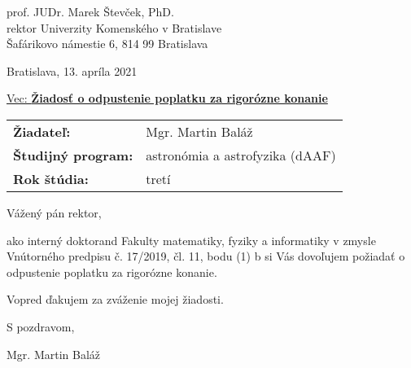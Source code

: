 \documentclass[12pt, a4paper, oneside]{report}
\begin{document}
    \linespread{1.3}
    \setcounter{secnumdepth}{0}
    \setlength{\parindent}{0cm}
    \setlength{\parskip}{3mm}
    \setlength{\baselineskip}{6mm}
    \setlength{\abovedisplayskip}{0mm}
    \setlength{\belowdisplayskip}{0mm}
    \setlength{\abovedisplayshortskip}{0mm}
    \setlength{\belowdisplayshortskip}{5mm}
    \renewcommand{\arraystretch}{1.2}

    \pagestyle{empty}
    \thispagestyle{first}

    \vspace*{26mm}
    \hfill
    \begin{minipage}{0.43 \linewidth}
        \linespread{1.6}
        prof. JUDr. Marek Števček, PhD. \\[1mm]
        rektor Univerzity Komenského v Bratislave \\[1mm]
        Šafárikovo námestie 6, 814 99 Bratislava

        \vspace*{12mm}
        Bratislava, 13. apríla 2021
    \end{minipage}

    \vspace{30mm}

    \underline{Vec: \textbf{Žiadosť o odpustenie poplatku za rigorózne konanie}}

    \vspace{4mm}

    \begin{tabular}{l l}
        \textbf{Žiadateľ:}          & Mgr. Martin Baláž \\
        \textbf{Študijný program:}  & astronómia a astrofyzika (dAAF) \\
        \textbf{Rok štúdia:}        & tretí \\
    \end{tabular}

    \vspace{20mm}

    Vážený pán rektor,

    ako interný doktorand Fakulty matematiky, fyziky a informatiky
    v zmysle Vnútorného predpisu č. 17/2019, čl. 11, bodu (1) b
    si Vás dovoľujem požiadať o odpustenie poplatku za rigorózne konanie.

    Vopred ďakujem za zváženie mojej žiadosti.

    \vspace*{6mm}

    S pozdravom,

    \hfill Mgr. Martin Baláž
\end{document}
